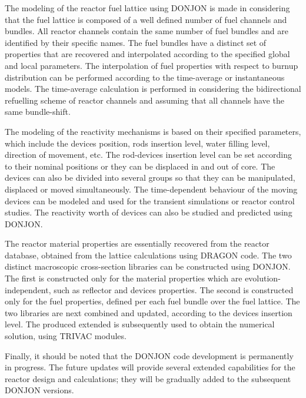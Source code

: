 The modeling of the reactor fuel lattice using DONJON is made in considering
that the fuel lattice is composed of a well defined number of fuel channels and
bundles. All reactor channels contain the same number of fuel bundles and are
identified by their specific names. The fuel bundles have a distinct set of properties
that are recovered and interpolated according to the specified global and local
parameters. The interpolation of fuel properties with respect to burnup distribution
can be performed according to the time-average or instantaneous models\cite{rozon}.
The time-average calculation is performed in considering the bidirectional refuelling
scheme of reactor channels and assuming that all channels have the same bundle-shift.

The modeling of the reactivity mechanisms is based on their specified parameters,
which include the devices position, rods insertion level, water filling level, direction
of movement, etc. The rod-devices insertion level can be set according to their
nominal positions or they can be displaced in and out of core. The devices can also
be divided into several groups so that they can be manipulated, displaced or moved
simultaneously. The time-dependent behaviour of the moving devices can be modeled
and used for the transient simulations or reactor control studies. The reactivity worth
of devices can also be studied and predicted using DONJON.

The reactor material properties are essentially recovered from the reactor database,
obtained from the lattice calculations using DRAGON code. The two distinct
macroscopic cross-section libraries can be constructed using DONJON.
The first  is constructed only for the material properties which
are evolution-independent, such as reflector and devices properties. The second
 is constructed only for the fuel properties, defined per each fuel
bundle over the fuel lattice. The two libraries are next combined and updated,
according to the devices insertion level. The produced extended 
is subsequently used to obtain the numerical solution, using TRIVAC modules.

Finally, it should be noted that the DONJON code development is permanently
in progress. The future updates will provide several extended capabilities
for the reactor design and calculations; they will be gradually added to the
subsequent DONJON versions.

